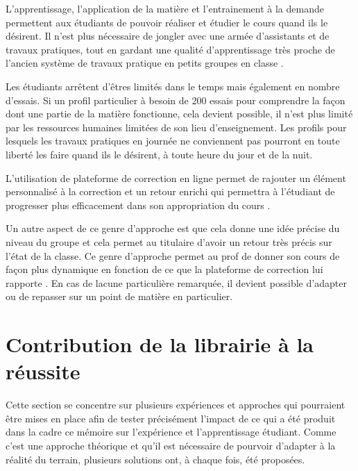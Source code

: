 \documentclass[a4paper]{report}
\begin{document}
L'apprentissage, l'application de la matière et l'entrainement à la demande permettent aux étudiants de pouvoir réaliser et étudier le cours quand ils le désirent.
Il n'est plus nécessaire de jongler avec une armée d'assistants et de travaux pratiques, tout en gardant une qualité d'apprentissage très proche de l'ancien système de travaux pratique en petits groupes en classe \cite{derval2015automatic}.

Les étudiants arrêtent d'êtres limités dans le temps mais également en nombre d'essais.
Si un profil particulier à besoin de 200 essais pour comprendre la façon dont une partie de la matière fonctionne, cela devient possible, il n'est plus limité par les ressources humaines limitées de son lieu d'enseignement.
Les profils pour lesquels les travaux pratiques en journée ne conviennent pas pourront en toute liberté les faire quand ils le désirent, à toute heure du jour et de la nuit.

L'utilisation de plateforme de correction en ligne permet de rajouter un élément personnalisé à la correction et un retour enrichi qui permettra à l'étudiant de progresser plus efficacement dans son appropriation du cours \cite{Derval2022}.

Un autre aspect de ce genre d'approche est que cela donne une idée précise du niveau du groupe et cela permet au titulaire d'avoir un retour très précis sur l'état de la classe.
Ce genre d'approche permet au prof de donner son cours de façon plus dynamique en fonction de ce que la plateforme de correction lui rapporte \cite{Martin}.
En cas de lacune particulière remarquée, il devient possible d'adapter ou de repasser sur un point de matière en particulier.


\section{Contribution de la librairie à la réussite}
Cette section se concentre sur plusieurs expériences et approches qui pourraient être mises en place afin de tester précisément l'impact de ce qui a été produit dans la cadre ce mémoire sur l'expérience et l'apprentissage étudiant.
Comme c'est une approche théorique et qu'il est nécessaire de pourvoir d'adapter à la réalité du terrain, plusieurs solutions ont, à chaque fois, été proposées.
\end{document}
